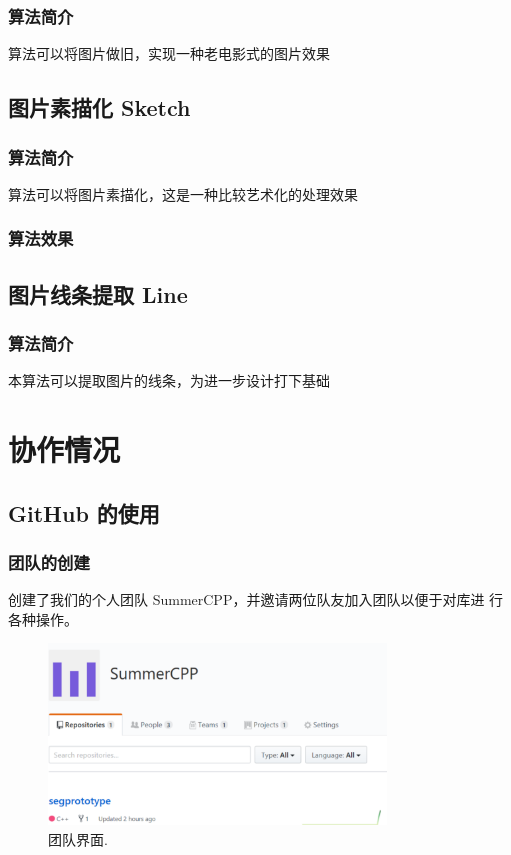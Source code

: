 \documentclass[14pt,a4paper]{article}
\begin{document}
\subsubsection{算法简介}
算法可以将图片做旧，实现一种老电影式的图片效果

\subsection{图片素描化 Sketch}
\subsubsection{算法简介}
算法可以将图片素描化，这是一种比较艺术化的处理效果
\subsubsection{算法效果}

\subsection{图片线条提取 Line}
\subsubsection{算法简介}
本算法可以提取图片的线条，为进一步设计打下基础



\newpage
\section{协作情况}
\subsection{GitHub 的使用}
\subsubsection{团队的创建 }
创建了我们的个人团队 SummerCPP，并邀请两位队友加入团队以便于对库进
行各种操作。
\nopagebreak
\begin{figure}[h]
\begin{center}
\includegraphics[width=0.8\textwidth]{image/team} 
\caption{团队界面.}
\end{center}
\end{figure}
\end{document}
